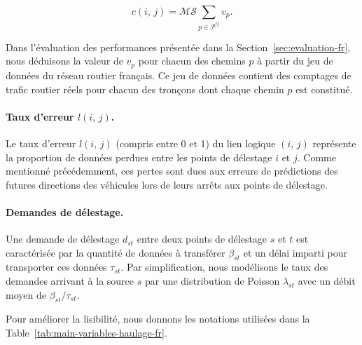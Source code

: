  
\begin{equation} 
  c(i,\,j) = \mathcal{M} \mathcal{S} \sum_{p\in \mathcal{P}^{ij}} v_{p}. 
\end{equation} 
 
 
Dans l’évaluation des performances présentée dans la Section~\ref{sec:evaluation-fr}, nous déduisons la valeur de $v_{p}$ pour chacun des chemins $p$ à partir du jeu de données du réseau routier français. Ce jeu de données contient des comptages de trafic routier réels pour chacun des tronçons dont chaque chemin $p$ est constitué. 
 
 
\paragraph{Taux d’erreur $l(i,\,j)$.} 
Le taux d’erreur $l(i,\,j)$ (compris entre 0 et 1) du lien logique $(i,\,j)$ représente la proportion de données perdues entre les points de délestage $i$ et $j$. Comme mentionné précédemment, ces pertes sont dues aux erreurs de prédictions des futures directions des véhicules lors de leurs arrêts aux points de délestage.  
 
 
\paragraph{Demandes de délestage.} 
Une demande de délestage $d_{st}$ entre deux points de délestage $s$ et $t$ est caractérisée par la quantité de données à transférer $\beta_{st}$ et un délai imparti pour transporter ces données $\tau_{st}$. Par simplification, nous modélisons le taux des demandes arrivant à la source $s$ par une distribution de Poisson $\lambda_{st}$ avec un débit moyen de $\beta_{st}/\tau_{st}$. 
 
 
Pour améliorer la lisibilité, nous donnons les notations utilisées dans la Table~\ref{tab:main-variables-haulage-fr}. 
 
